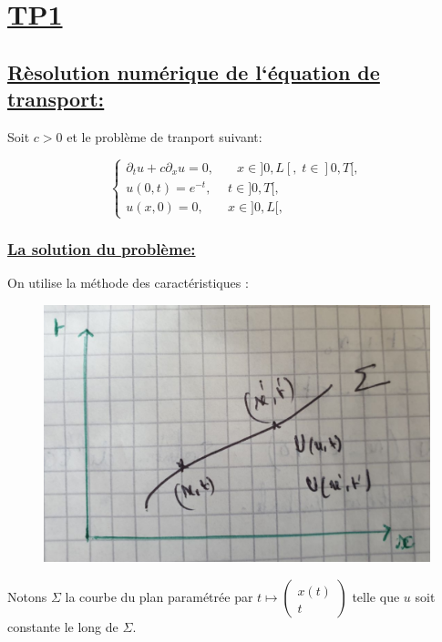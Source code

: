 \chapter[TP1]{\uline{TP1}}
\section[R\`esolution num\'erique de l`\'equation de transport]{\uline{R\`esolution num\'erique de l`\'equation de transport:}}

Soit $c>0$ et le probl\`eme de tranport suivant:

\begin{equation}
\label{systeme}
\left \lbrace \begin{array}{rl}
\partial_t u + c \partial_x u= 0, & \quad x \in ]0,L[, \; t \in ]0,T[, \\
u(0,t) = e^{-t}, & \; t \in ]0,T[, \\
u(x,0) = 0, & \; x \in ]0,L[,
\end{array}\right.
\end{equation}

\subsection[La solution du probl\`eme]{\uline{La solution du probl\`eme:}}
On utilise la m\'ethode des caract\'eristiques : 

\begin{figure}[h!]
	\centering \includegraphics[scale=0.2]{Images_Fichiers/Y1.png}
\end{figure}

Notons $\Sigma$ la courbe du plan param\'etr\'ee par $t\mapsto \left(\begin{array}{c}x(t)\\t\end{array}\right)$ telle que $u$ soit constante le long de $\Sigma$.

